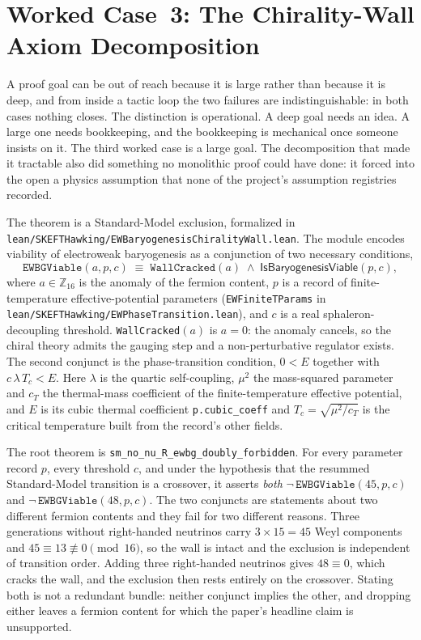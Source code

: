 \documentclass[11pt]{article}
\begin{document}
\section{Worked Case~3: The Chirality-Wall Axiom Decomposition}
\label{sec:case3}

A proof goal can be out of reach because it is large rather than
because it is deep, and from inside a tactic loop the two failures are
indistinguishable: in both cases nothing closes. The distinction is
operational. A deep goal needs an idea. A large one needs bookkeeping,
and the bookkeeping is mechanical once someone insists on it. The third
worked case is a large goal. The decomposition that made it tractable
also did something no monolithic proof could have done: it forced into
the open a physics assumption that none of the project's assumption
registries recorded.

The theorem is a Standard-Model exclusion, formalized in
\texttt{lean/SKEFTHawking/EWBaryogenesisChiralityWall.lean}. The module
encodes viability of electroweak baryogenesis as a conjunction of two
necessary conditions,
\begin{equation}
\label{eq:ewbgviable}
\texttt{EWBGViable}(a, p, c) \;\equiv\;
\texttt{WallCracked}(a) \;\wedge\;
\mathsf{IsBaryogenesisViable}(p, c),
\end{equation}
where $a \in \mathbb{Z}_{16}$ is the anomaly of the fermion content,
$p$ is a record of finite-temperature effective-potential parameters
(\texttt{EWFiniteTParams} in
\texttt{lean/SKEFTHawking/EWPhaseTransition.lean}), and $c$ is a real
sphaleron-decoupling threshold. \texttt{WallCracked}$(a)$ is $a = 0$:
the anomaly cancels, so the chiral theory admits the gauging step and a
non-perturbative regulator exists. The second conjunct is the
phase-transition condition, $0 < E$ together with
$c\,\lambda\,T_c < E$. Here $\lambda$ is the quartic self-coupling,
$\mu^2$ the mass-squared parameter and $c_T$ the thermal-mass
coefficient of the finite-temperature effective potential, and $E$ is
its cubic thermal coefficient
\texttt{p.cubic\_coeff} and
$T_c = \sqrt{\mu^2 / c_T}$ is the critical temperature built from the
record's other fields.

The root theorem is
\texttt{sm\_no\_nu\_R\_ewbg\_doubly\_forbidden}. For every parameter
record $p$, every threshold $c$, and under the hypothesis that the
resummed Standard-Model transition is a crossover, it asserts
\emph{both}
$\neg\,\texttt{EWBGViable}(45, p, c)$ and
$\neg\,\texttt{EWBGViable}(48, p, c)$. The two conjuncts are statements
about two different fermion contents and they fail for two different
reasons. Three generations without right-handed neutrinos carry
$3 \times 15 = 45$ Weyl components and $45 \equiv 13 \not\equiv 0
\pmod{16}$, so the wall is intact and the exclusion is independent of
transition order. Adding three right-handed neutrinos gives $48 \equiv
0$, which cracks the wall, and the exclusion then rests entirely on the
crossover. Stating both is not a redundant bundle: neither conjunct
implies the other, and dropping either leaves a fermion content for
which the paper's headline claim is unsupported.
\end{document}
